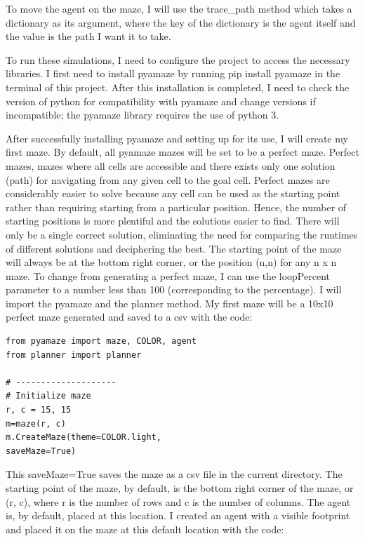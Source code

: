 \documentclass[10pt,twocolumn]{article}
\begin{document}
To move the agent on the maze, I will use the trace\_path method which takes a dictionary as its argument, where the key of the dictionary is the agent itself and the value is the path I want it to take.

To run these simulations, I need to configure the project to access the necessary libraries. I first need to install pyamaze by running pip install pyamaze in the terminal of this project. After this installation is completed, I need to check the version of python for compatibility with pyamaze and change versions if incompatible; the pyamaze library requires the use of python 3.

After successfully installing pyamaze and setting up for its use, I will create my first maze. By default, all pyamaze mazes will be set to be a perfect maze. Perfect mazes, mazes where all cells are accessible and there exists only one solution (path) for navigating from any given cell to the goal cell. Perfect mazes are considerably easier to solve because any cell can be used as the starting point rather than requiring starting from a particular position. Hence, the number of starting positions is more plentiful and the solutions easier to find. There will only be a single correct solution, eliminating the need for comparing the runtimes of different solutions and deciphering the best. The starting point of the maze will always be at the bottom right corner, or the position (n,n) for any n x n maze. To change from generating a perfect maze, I can use the loopPercent parameter to a number less than 100 (corresponding to the percentage). I will import the pyamaze and the planner method. My first maze will be a 10x10 perfect maze generated and saved to a csv with the code:

\begin{verbatim}
from pyamaze import maze, COLOR, agent
from planner import planner

# --------------------
# Initialize maze
r, c = 15, 15
m=maze(r, c)
m.CreateMaze(theme=COLOR.light, 
saveMaze=True)
\end{verbatim}

This saveMaze=True saves the maze as a csv file in the current directory. The starting point of the maze, by default, is the bottom right corner of the maze, or (r, c), where r is the number of rows and c is the number of columns. The agent is, by default, placed at this location. I created an agent with a visible footprint and placed it on the maze at this default location with the code:
\end{document}
